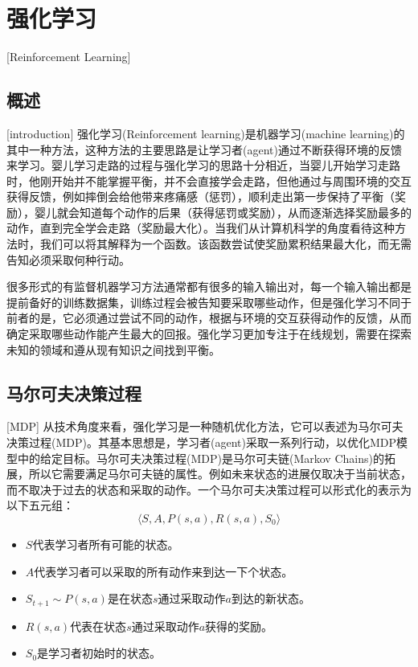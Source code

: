 \section{强化学习}[Reinforcement Learning]
\subsection{概述}[introduction]
强化学习(Reinforcement learning)\cite{RLIntroduction}是机器学习(machine learning)的其中一种方法，这种方法的主要思路是让学习者(agent)通过不断获得环境的反馈来学习。婴儿学习走路的过程与强化学习的思路十分相近，当婴儿开始学习走路时，他刚开始并不能掌握平衡，并不会直接学会走路，但他通过与周围环境的交互获得反馈，例如摔倒会给他带来疼痛感（惩罚），顺利走出第一步保持了平衡（奖励），婴儿就会知道每个动作的后果（获得惩罚或奖励），从而逐渐选择奖励最多的动作，直到完全学会走路（奖励最大化）。当我们从计算机科学的角度看待这种方法时，我们可以将其解释为一个函数。该函数尝试使奖励累积结果最大化，而无需告知必须采取何种行动。

很多形式的有监督机器学习方法通常都有很多的输入输出对，每一个输入输出都是提前备好的训练数据集，训练过程会被告知要采取哪些动作，但是强化学习不同于前者的是，它必须通过尝试不同的动作，根据与环境的交互获得动作的反馈，从而确定采取哪些动作能产生最大的回报。强化学习更加专注于在线规划，需要在探索未知的领域和遵从现有知识之间找到平衡。

\subsection{马尔可夫决策过程}[MDP]
从技术角度来看，强化学习是一种随机优化方法，它可以表述为马尔可夫决策过程(MDP)\cite{MDP}。其基本思想是，学习者(agent)采取一系列行动，以优化MDP模型中的给定目标。马尔可夫决策过程(MDP)是马尔可夫链(Markov Chains)的拓展，所以它需要满足马尔可夫链的属性。例如未来状态的进展仅取决于当前状态，而不取决于过去的状态和采取的动作。一个马尔可夫决策过程可以形式化的表示为以下五元组：
\begin{equation}\label{MDP5}
\langle S, A, P(s,a),R(s,a),S_0 \rangle
\end{equation}
\begin{itemize}
    \item $S$代表学习者所有可能的状态。
    \item $A$代表学习者可以采取的所有动作来到达一下个状态。
    \item $S_{t+1}\sim P(s,a)$是在状态$s$通过采取动作$a$到达的新状态。
    \item $R(s,a)$代表在状态$s$通过采取动作$a$获得的奖励。
    \item $S_0$是学习者初始时的状态。
\end{itemize}

